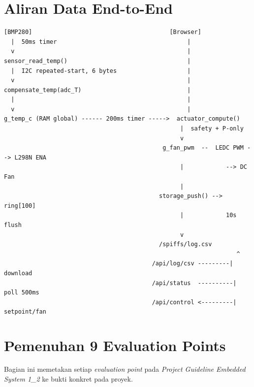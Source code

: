 \documentclass[11pt,a4paper]{article}
\begin{document}
\section{Aliran Data End-to-End}

\begin{center}
\begin{verbatim}
[BMP280]                                       [Browser]
  |  50ms timer                                     |
  v                                                 |
sensor_read_temp()                                  |
  |  I2C repeated-start, 6 bytes                    |
  v                                                 |
compensate_temp(adc_T)                              |
  |                                                 |
  v                                                 |
g_temp_c (RAM global) ------ 200ms timer ----->  actuator_compute()
                                                  |  safety + P-only
                                                  v
                                             g_fan_pwm  --  LEDC PWM --> L298N ENA
                                                  |            --> DC Fan
                                                  |
                                            storage_push() --> ring[100]
                                                  |            10s flush
                                                  v
                                            /spiffs/log.csv
                                                                  ^
                                          /api/log/csv ---------|  download
                                          /api/status  ----------|  poll 500ms
                                          /api/control <---------|  setpoint/fan
\end{verbatim}
\end{center}

\section{Pemenuhan 9 Evaluation Points}

Bagian ini memetakan setiap \emph{evaluation point} pada \emph{Project Guideline Embedded System 1\_2} ke bukti konkret pada proyek.
\end{document}
